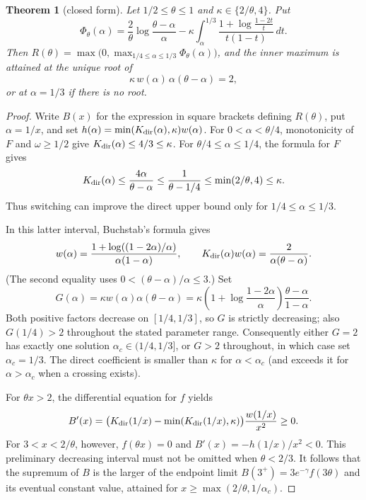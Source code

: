 \documentclass[final,11pt]{elsarticle}
\newtheorem{theorem}{Theorem}[section]
\theoremstyle{definition}
\theoremstyle{remark}
\numberwithin{equation}{section}
\begin{document}
\begin{theorem}[closed form]\label{thm:closed-form}
Let $1/2\le\theta\le1$ and $\kappa\in\{2/\theta,4\}$. Put
\[
\Phi_\theta(\alpha)=\frac2\theta\log\frac{\theta-\alpha}{\alpha}-\kappa\int_\alpha^{1/3}\frac{1+\log\frac{1-2t}{t}}{t(1-t)}\,dt .
\]
Then $R(\theta)=\max\bigl(0,\max_{1/4\le\alpha\le1/3}\Phi_\theta(\alpha)\bigr)$, and the inner maximum is attained at the unique root of
\[
\kappa\,w(\alpha)\,\alpha(\theta-\alpha)=2,
\]
or at $\alpha=1/3$ if there is no root.
\end{theorem}

\begin{proof}
Write $B(x)$ for the expression in square brackets defining $R(\theta)$,
put $\alpha=1/x$, and set
$h(\alpha)=\min(K_{\rm dir}(\alpha),\kappa)w(\alpha)$.
For $0<\alpha<\theta/4$, monotonicity of $F$ and
$\omega\ge1/2$ give
$K_{\rm dir}(\alpha)\le4/3\le\kappa$. For
$\theta/4\le\alpha\le1/4$, the formula for $F$ gives
\[
 K_{\rm dir}(\alpha)\le\frac{4\alpha}{\theta-\alpha}
 \le\frac1{\theta-1/4}\le\min(2/\theta,4)\le\kappa.
\]
Thus switching can improve the direct upper bound only for
$1/4\le\alpha\le1/3$.

In this latter interval, Buchstab's formula gives
\[
 w(\alpha)=\frac{1+\log((1-2\alpha)/\alpha)}
                   {\alpha(1-\alpha)},
 \qquad K_{\rm dir}(\alpha)w(\alpha)
       =\frac{2}{\alpha(\theta-\alpha)}.
\]
(The second equality uses $0<(\theta-\alpha)/\alpha\le3$.)
Set
\[
 G(\alpha)=\kappa w(\alpha)\alpha(\theta-\alpha)
 =\kappa\left(1+\log\frac{1-2\alpha}{\alpha}\right)
             \frac{\theta-\alpha}{1-\alpha}.
\]
Both positive factors decrease on $[1/4,1/3]$, so $G$ is
strictly decreasing; also $G(1/4)>2$ throughout the stated parameter
range. Consequently either $G=2$ has exactly one solution
$\alpha_c\in(1/4,1/3]$, or $G>2$ throughout, in which case set
$\alpha_c=1/3$. The direct coefficient is smaller than $\kappa$
for $\alpha<\alpha_c$ (and exceeds it for $\alpha>\alpha_c$
when a crossing exists).

For $\theta x>2$, the differential equation for $f$ yields
\[
 B'(x)=\bigl(K_{\rm dir}(1/x)
       -\min(K_{\rm dir}(1/x),\kappa)\bigr)
                 \frac{w(1/x)}{x^2}\ge0.
\]
For $3<x<2/\theta$, however, $f(\theta x)=0$ and
$B'(x)=-h(1/x)/x^2<0$. This preliminary decreasing interval
must not be omitted when $\theta<2/3$. It follows that the
supremum of $B$ is the larger of the endpoint limit
$B(3^+)=3e^{-\gamma}f(3\theta)$ and its eventual constant
value, attained for
$x\ge\max(2/\theta,1/\alpha_c)$.


\end{proof}
\end{document}
